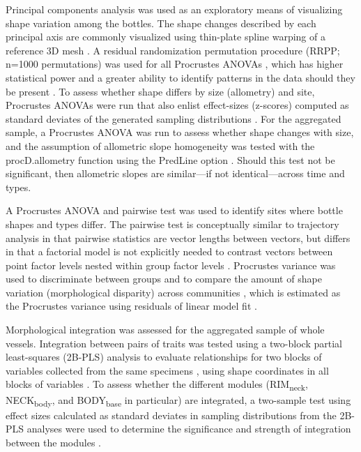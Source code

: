 \documentclass[article]{sa}
\begin{document}
Principal components analysis \citep{RN1746} was used as an exploratory means of visualizing shape variation among the bottles. The shape changes described by each principal axis are commonly visualized using thin-plate spline warping of a reference 3D mesh \citep{RN1731,RN479}. A residual randomization permutation procedure (RRPP; n=1000 permutations) was used for all Procrustes ANOVAs \citep{RN1655,RN11775}, which has higher statistical power and a greater ability to identify patterns in the data should they be present \citep{RN1719}. To assess whether shape differs by size (allometry) and site, Procrustes ANOVAs \citep{RN1749} were run that also enlist effect-sizes (z-scores) computed as standard deviates of the generated sampling distributions \citep{RN1756}. For the aggregated sample, a Procrustes ANOVA was run to assess whether shape changes with size, and the assumption of allometric slope homogeneity was tested with the procD.allometry function using the PredLine option \citep{RN1649}. Should this test not be significant, then allometric slopes are similar---if not identical---across time and types.

A Procrustes ANOVA and pairwise test was used to identify sites where bottle shapes and types differ. The pairwise test is conceptually similar to trajectory analysis \citep{RN11573,RN1648,RN4445,RN1739} in that pairwise statistics are vector lengths between vectors, but differs in that a factorial model is not explicitly needed to contrast vectors between point factor levels nested within group factor levels \citep{RN11530}. Procrustes variance was used to discriminate between groups and to compare the amount of shape variation (morphological disparity) across communities \citep{RN11560}, which is estimated as the Procrustes variance using residuals of linear model fit \citep{RN11530}.

Morphological integration was assessed for the aggregated sample of whole vessels. Integration between pairs of traits was tested using a two-block partial least-squares (2B-PLS) analysis to evaluate relationships for two blocks of variables collected from the same specimens \citep{RN11615,RN11613,RN11614}, using shape coordinates in all blocks of variables \cite{RN11616,RN11615,RN11617}. To assess whether the different modules (RIM\textsubscript{neck}, NECK\textsubscript{body}, and BODY\textsubscript{base} in particular) are integrated, a two-sample test using effect sizes calculated as standard deviates in sampling distributions from the 2B-PLS analyses were used to determine the significance and strength of integration between the modules \citep{RN11700}.
\end{document}
